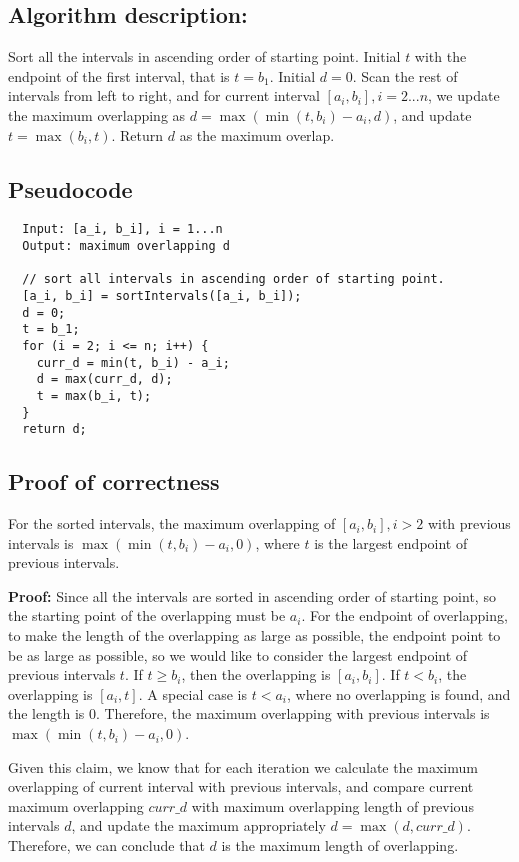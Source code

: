 \documentclass[paper=a4, fontsize=11pt]{scrartcl} %
\numberwithin{equation}{section} %
\numberwithin{figure}{section} %
\numberwithin{table}{section} %
\newcounter{claimcounter}
\numberwithin{claimcounter}{section}
\newenvironment{claim}{\stepcounter{claimcounter}{\textbf{Claim \theclaimcounter:}}}{}
\begin{document}
\subsection*{Algorithm description:}
Sort all the intervals in ascending order of starting point. Initial $t$ with
the endpoint of the first interval, that is $t = b_1$. Initial $d = 0$. 
Scan the rest of intervals from left to
right, and for current interval $[a_i, b_i], i = 2...n$, we update the maximum overlapping
as $d = \max(\min(t,b_i) - a_i, d)$, and update $t = \max(b_i, t)$. Return $d$ as the maximum overlap. 

\subsection*{Pseudocode}
\begin{verbatim}
  Input: [a_i, b_i], i = 1...n
  Output: maximum overlapping d

  // sort all intervals in ascending order of starting point.
  [a_i, b_i] = sortIntervals([a_i, b_i]);
  d = 0;
  t = b_1;
  for (i = 2; i <= n; i++) {
    curr_d = min(t, b_i) - a_i;
    d = max(curr_d, d);
    t = max(b_i, t);
  }
  return d;
\end{verbatim}

\subsection*{Proof of correctness}
\begin{claim}
  For the sorted intervals, the maximum overlapping of $[a_i, b_i], i > 2$ with
  previous intervals is $\max(\min(t, b_i) - a_i, 0)$, where $t$ is the largest
  endpoint of previous intervals.
\end{claim}

\textbf{Proof:}
Since all the intervals are sorted in ascending order of starting point, so the
starting point of the overlapping must be $a_i$. For the endpoint of overlapping,
to make the length of the overlapping as large as possible, the endpoint point
to be as large as possible, so we would like to consider the largest endpoint
of previous intervals $t$. If $t \geq b_i$, then the overlapping is $[a_i, b_i]$.
If $t < b_i$, the overlapping is $[a_i, t]$. A special case is $t < a_i$, where
no overlapping is found, and the length is 0. Therefore, the maximum 
overlapping with previous intervals is $\max(\min(t, b_i) - a_i, 0)$.

Given this claim, we know that for each iteration we calculate the maximum
overlapping of current interval with previous intervals, and compare current 
maximum overlapping $curr\_d$ with maximum overlapping length of previous
intervals $d$,
and update the maximum appropriately $d = \max(d, curr\_d)$. Therefore, we can
conclude that $d$ is the maximum length of overlapping.
\end{document}
